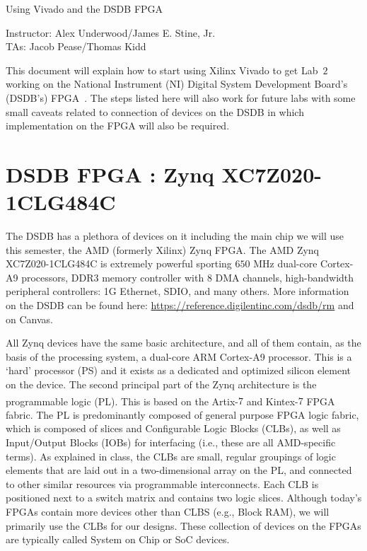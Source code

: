 \documentclass{article}
\newcommand{\myassignment}{Using Vivado and the DSDB FPGA}
\newcommand{\myinstructor}{Instructor: Alex Underwood/James E. Stine, Jr.}
\newcommand{\mytas}{TAs: Jacob Pease/Thomas Kidd}
\begin{document}
\begin{center}
  {\huge \myassignment} \\
  \begin{flushright}
    \myinstructor \\
    \mytas \\
  \end{flushright}
\end{center}

This document will explain how to start using Xilinx Vivado to get Lab~$2$
working on the National Instrument (NI) Digital System Development
Board's (DSDB's) FPGA~\cite{dsdb1}.  The steps listed here will also work for
future labs with some small caveats related to connection of devices
on the DSDB in which implementation on the FPGA will also be required.

\section{DSDB FPGA : Zynq XC7Z020-1CLG484C}

The DSDB has a plethora of devices on it including the main chip we
will use this semester, the AMD (formerly Xilinx) Zynq FPGA.  The AMD Zynq
XC7Z020-1CLG484C is extremely powerful sporting  $650$ MHz
dual-core Cortex-A9 processors,  DDR3 memory controller with $8$ DMA
channels,  high-bandwidth peripheral controllers: 1G Ethernet, SDIO,
and many others.  More information on the DSDB can be found here:
\url{https://reference.digilentinc.com/dsdb/rm} and on Canvas.

All Zynq devices have the same basic architecture, and all of them
contain, as the basis of
the processing system, a dual-core ARM Cortex-A9 processor. This is a
‘hard’ processor (PS) and
it exists as a dedicated and optimized silicon element on the device.
The second principal part of the Zynq architecture is the programmable
logic (PL). This is
based on the Artix\textsuperscript{\textregistered}-$7$ and
Kintex\textsuperscript{\textregistered}-$7$ FPGA fabric.
The PL is predominantly composed of general purpose FPGA logic fabric,
which is composed of slices and Configurable Logic Blocks (CLBs), as
well as Input/Output Blocks (IOBs) for interfacing 
(i.e., these are all AMD-specific terms).   As explained in class,
the CLBs are small, regular groupings of logic
elements that are laid out in a two-dimensional array on the PL, and
connected to
other similar resources via programmable interconnects.
Each CLB is positioned
next to a switch matrix and contains two logic slices.  Although
today's FPGAs contain more devices other than CLBS (e.g., Block RAM),
we will primarily use the CLBs for our designs.  These collection of
devices on the FPGAs are typically called System on Chip or SoC devices.
\end{document}
